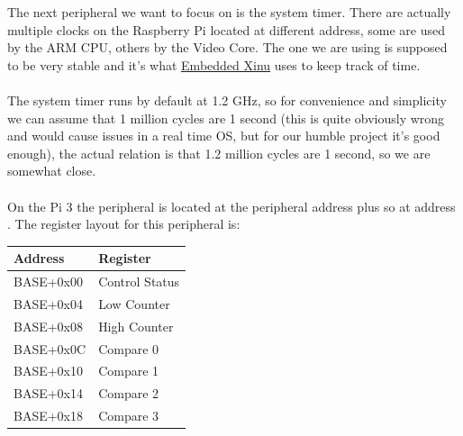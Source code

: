 \documentclass[12pt, svgnames]{book}
\begin{document}
The next peripheral we want to focus on is the system timer. There are actually multiple clocks on the Raspberry Pi located at different address, some are used by the ARM CPU, others by the Video Core. The one we are using is supposed to be very stable and it's what \href{http://embedded-xinu.readthedocs.io/en/latest/arm/rpi/}{Embedded Xinu} uses to keep track of time.
\\~\\
The system timer runs by default at 1.2 GHz, so for convenience and simplicity we can assume that 1 million cycles are 1 second (this is quite obviously wrong and would cause issues in a real time OS, but for our humble project it's good enough), the actual relation is that 1.2 million cycles are 1 second, so we are somewhat close.
\\~\\
On the Pi 3 the peripheral is located at the peripheral address plus  so at address . The register layout for this peripheral is:

\hypertarget{system timer}{}
\begin{center}
	{
		\begin{tabular}{|l | l|}
			\hline
			Address & Register\\
			\hline
			BASE+0x00 & Control Status\\
			BASE+0x04 & Low Counter\\
			BASE+0x08 & High Counter\\
			BASE+0x0C & Compare 0\\
			BASE+0x10 & Compare 1\\
			BASE+0x14 & Compare 2\\
			BASE+0x18 & Compare 3\\
			\hline
		\end{tabular}
	}
\end{center}
\end{document}

